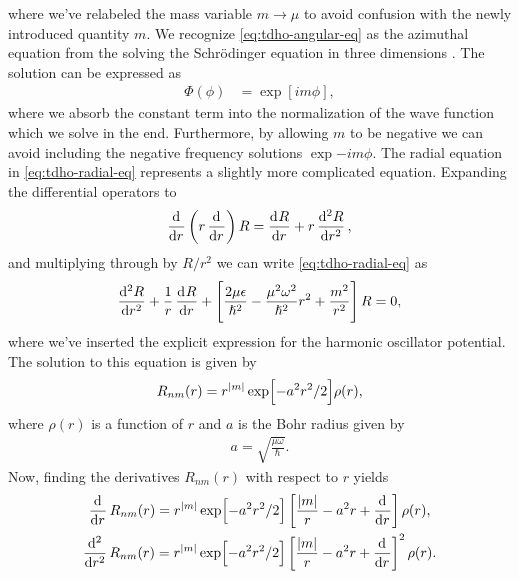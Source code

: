         where we've relabeled the mass variable $m \to \mu$ to avoid confusion
        with the newly introduced quantity $m$.
        We recognize \autoref{eq:tdho-angular-eq} as the azimuthal equation from
        the solving the Schrödinger equation in three dimensions
        \cite{griffiths2017introduction}.
        The solution can be expressed as
        \begin{align}
            \Phi(\phi) &= \exp[im\phi],
        \end{align}
        where we absorb the constant term into the normalization of the wave
        function which we solve in the end.
        Furthermore, by allowing $m$ to be negative we can avoid including the
        negative frequency solutions $\exp{-im\phi}$.
        The radial equation in \autoref{eq:tdho-radial-eq} represents a slightly
        more complicated equation.
        Expanding the differential operators to
        \begin{align}
            \dod{}{r}\para{
                r\dod{}{r}
            }R
            = \dod{R}{r} + r\dod[2]{R}{r},
        \end{align}
        and multiplying through by $R/r^2$ we can write
        \autoref{eq:tdho-radial-eq} as
        \begin{gather}
            \dod[2]{R}{r}
            + \frac{1}{r}\dod{R}{r}
            + \brak{
                \frac{2\mu \epsilon}{\hslash^2}
                - \frac{\mu^2\omega^2}{\hslash^2} r^2
                + \frac{m^2}{r^2}
            } R
            = 0,
        \end{gather}
        where we've inserted the explicit expression for the harmonic oscillator
        potential.
        The solution to this equation is given by \cite{sandev2005selection}
        \begin{align}
            R_{nm}(r)
            = r^{\abs{m}}
            \exp[-a^2 r^2/2]
            \rho(r),
        \end{align}
        where $\rho(r)$ is a function of $r$ and $a$ is the Bohr radius given by
        \begin{align}
            a = \sqrt{\frac{\mu \omega}{\hslash}}.
            \label{eq:bohr-radius}
        \end{align}
        Now, finding the derivatives $R_{nm}(r)$ with respect to $r$ yields
        \begin{gather}
            \dod{}{r}R_{nm}(r)
            = r^{\abs{m}} \exp[-a^2 r^2 / 2] \brak{
                \frac{\abs{m}}{r} - a^2 r + \dod{}{r}
            }\rho(r),
            \\
            \dod[2]{}{r}R_{nm}(r)
            = r^{\abs{m}} \exp[-a^2 r^2 / 2] \brak{
                \frac{\abs{m}}{r} - a^2 r + \dod{}{r}
            }^2\rho(r).
        \end{gather}
